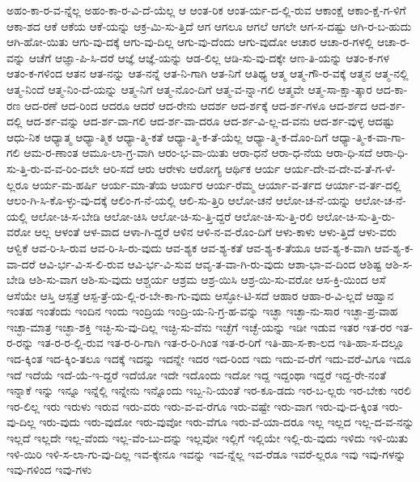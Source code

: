 {ಅಹಂ-ಕಾ-ರ-ವ-ನ್ನೆಲ್ಲ
ಅಹಂ-ಕಾ-ರ-ವಿ-ದೆ-ಯೆಲ್ಲ
ಆ
ಆಂತ-ರಿಕ
ಆಂತ-ರ್ಯ-ದ-ಲ್ಲಿ-ರುವ
ಆಕಾಂಕ್ಷೆ
ಆಕಾಂ-ಕ್ಷೆ-ಗ-ಳಿಗೆ
ಆಕಾ-ಶದ
ಆಕೆ
ಆಕೆಯ
ಆಕೆ-ಯನ್ನು
ಆಕ್ರ-ಮಿ-ಸು-ತ್ತಿದೆ
ಆಗ
ಆಗಲೂ
ಆಗಲೆ
ಆಗಲೇ
ಆಗ-ಸ-ದಷ್ಟು
ಆಗಿ-ರ-ಬ-ಹುದು
ಆಗಿ-ಹೋ-ಯಿತು
ಆಗು-ವು-ದಕ್ಕೆ
ಆಗು-ವು-ದಿಲ್ಲ
ಆಗು-ವು-ದೆಂದು
ಆಗು-ವುದೋ
ಆಚಾರ
ಆಚಾ-ರ-ಗಳಲ್ಲಿ
ಆಚಾ-ರ-ವನ್ನು
ಆಚೆಗೆ
ಆಜ್ಞಾ-ಪಿ-ಸಿ-ದರೆ
ಆಜ್ಞೆ
ಆಜ್ಞೆ-ಯನ್ನು
ಆಡ-ಲಿಲ್ಲ
ಆಡಿ-ಸು-ವು-ದಕ್ಕೇ
ಆಣ-ತಿ-ಯನ್ನು
ಆತಂ-ಕ-ಗಳ
ಆತಂ-ಕ-ಗಳಿಂದ
ಆತನ
ಆತ-ನನ್ನು
ಆತ-ನನ್ನೆ
ಆತ-ನಿ-ಗಾಗಿ
ಆತ-ನಿಗೆ
ಆತಿಥ್ಯ
ಆತ್ಮ
ಆತ್ಮ-ಗೌ-ರ-ವಕ್ಕೆ
ಆತ್ಮನ
ಆತ್ಮ-ನಲ್ಲಿ
ಆತ್ಮ-ನಿಂದೆ
ಆತ್ಮ-ನಿಂ-ದೆ-ಯನ್ನು
ಆತ್ಮ-ನಿಗೆ
ಆತ್ಮ-ನೊಂ-ದಿಗೆ
ಆತ್ಮ-ವ-ನ್ನಾ-ಗಲಿ
ಆತ್ಮವೇ
ಆತ್ಮ-ಸಾ-ಕ್ಷಾ-ತ್ಕಾರ
ಆದ-ಕಾ-ರಣ
ಆದ-ರಣೆ
ಆದ-ರಿಂದ
ಆದರೂ
ಆದರೆ
ಆದ-ರೇನು
ಆದರ್ಶ
ಆದ-ರ್ಶಕ್ಕೆ
ಆದ-ರ್ಶ-ಗಳೂ
ಆದ-ರ್ಶದ
ಆದ-ರ್ಶ-ದಲ್ಲಿ
ಆದ-ರ್ಶ-ವನ್ನು
ಆದ-ರ್ಶ-ವಾ-ಗಲಿ
ಆದ-ರ್ಶ-ವಾ-ದರೂ
ಆದ-ರ್ಶ-ವಿ-ಲ್ಲ-ದ-ವನು
ಆದ-ರ್ಶ-ವುಳ್ಳ
ಆದಷ್ಟು
ಆಧು-ನಿಕ
ಆಧ್ಯಾತ್ಮ
ಆಧ್ಯಾ-ತ್ಮಿಕ
ಆಧ್ಯಾ-ತ್ಮಿ-ಕತೆ
ಆಧ್ಯಾ-ತ್ಮಿ-ಕ-ತೆ-ಯೆಲ್ಲ
ಆಧ್ಯಾ-ತ್ಮಿ-ಕ-ದೊಂ-ದಿಗೆ
ಆಧ್ಯಾ-ತ್ಮಿ-ಕ-ವಾ-ಗಾ-ಗಲಿ
ಆಮ-ರ-ಣಾಂತ
ಆಮೂ-ಲಾ-ಗ್ರ-ವಾಗಿ
ಆರಂ-ಭ-ವಾ-ಯಿತು
ಆರಾ-ಧನೆ
ಆರಾ-ಧ-ನೆಯ
ಆರಾ-ಧಿ-ಸದೆ
ಆರಾ-ಧಿ-ಸು-ತ್ತಿ-ರು-ವ-ವ-ರಿಂ-ದಲೇ
ಆರಿ-ಸದೆ
ಆರು
ಆರೇಳು
ಆರೋಗ್ಯ
ಆರ್ಥಿಕ
ಆರ್ಯ
ಆರ್ಯ-ದೇ-ವ-ದೇ-ವ-ತೆ-ಗ-ಳೆ-ಲ್ಲರೂ
ಆರ್ಯ-ಮ-ಹರ್ಷಿ
ಆರ್ಯ-ಮಾ-ತೆಯ
ಆರ್ಯರ
ಆರ್ಯ-ರೆಮ್ಮ
ಆರ್ಯಾ-ವ-ರ್ತದ
ಆರ್ಯಾ-ವ-ರ್ತ-ದಲ್ಲಿ
ಆಲಂ-ಗಿ-ಸಿ-ಕೊ-ಳ್ಳು-ವು-ದಕ್ಕೆ
ಆಲಿಂ-ಗ-ನೆ-ಯಲ್ಲಿ
ಆಲಿ-ಸು-ತ್ತಿರಿ
ಆಲೋ-ಚನೆ
ಆಲೋ-ಚ-ನೆ-ಯನ್ನು
ಆಲೋ-ಚ-ನೆ-ಯಲ್ಲಿ
ಆಲೋ-ಚಿ-ಸ-ಬೇಡಿ
ಆಲೋ-ಚಿಸಿ
ಆಲೋ-ಚಿ-ಸು-ತ್ತಿ-ದ್ದರೆ
ಆಲೋ-ಚಿ-ಸು-ತ್ತಿ-ರಲಿ
ಆಲೋ-ಚಿ-ಸು-ತ್ತಿ-ರು-ವರೋ
ಆಲ್ಲ
ಆಳಂತೆ
ಆಳ-ವಾದ
ಆಳಾ-ಗಿ-ದ್ದರೆ
ಆಳಿನ
ಆಳಿ-ನ-ವ-ರೊಂ-ದಿಗೆ
ಆಳು-ಕಾಳು
ಆಳು-ತ್ತಿದೆ
ಆಳು-ವರು
ಆಳ್ವಿಕೆ
ಆವ-ರಿ-ಸಿ-ರುವ
ಆವ-ರಿ-ಸಿ-ರು-ವುದು
ಆವ-ಶ್ಯಕ
ಆವ-ಶ್ಯ-ಕತೆ
ಆವ-ಶ್ಯ-ಕ-ತೆಯೂ
ಆವ-ಶ್ಯ-ಕ-ವಾಗಿ
ಆವ-ಶ್ಯ-ಕ-ವಾ-ದರೆ
ಆವಿ-ರ್ಭ-ವಿ-ಸ-ಲಿ-ರುವ
ಆವಿ-ರ್ಭ-ವಿ-ಸುವ
ಆವೃ-ತ-ವಾ-ಗಿ-ರು-ವುದು
ಆಶಾ-ಭಾ-ವ-ದಿಂದ
ಆಶಿಷ್ಟ
ಆಶಿ-ಸ-ಬೇಡಿ
ಆಶಿ-ಸು-ವಾಗ
ಆಶಿ-ಸು-ವುದು
ಆಶ್ಚರ್ಯ
ಆಶ್ರಮ
ಆಶ್ರ-ಯಿಸಿ
ಆಶ್ರ-ಯಿ-ಸು-ವರೋ
ಆಸ-ಕ್ತಿ-ಯಿಂದ
ಆಸೆ
ಆಸೆಯೇ
ಆಸ್ತಿ
ಆಸ್ಪತ್ರೆ
ಆಸ್ಪ-ತ್ರೆ-ಯ-ಲ್ಲಿ-ರ-ಬೇ-ಕಾ-ಗು-ವುದು
ಆಸ್ಫೋ-ಟಿ-ಸದೆ
ಆಹಾರ
ಆಹಾ-ರ-ವಿ-ಲ್ಲದೆ
ಆಹ್ವಾನ
ಇಂತಹ
ಇಂತೆಂದು
ಇಂದಿನ
ಇಂದು
ಇಂದ್ರಿಯ
ಇಂದ್ರಿ-ಯ-ನಿ-ಗ್ರ-ಹ-ವನ್ನು
ಇಚ್ಛಾ
ಇಚ್ಛಾ-ನು-ಸಾರ
ಇಚ್ಛಾ-ಪ್ರ-ವಾಹ
ಇಚ್ಛಾ-ಮಾತ್ರ
ಇಚ್ಛಾ-ಶಕ್ತಿ
ಇಚ್ಛಿ-ಸು-ವು-ದಿಲ್ಲ
ಇಚ್ಛಿ-ಸು-ವೆನು
ಇಚ್ಛೆಗೆ
ಇಚ್ಛೆ-ಯನ್ನು
ಇಡೀ
ಇಡುವ
ಇತರ
ಇತ-ರರ
ಇತ-ರ-ರನ್ನು
ಇತ-ರ-ರ-ಲ್ಲಿ-ರುವ
ಇತ-ರ-ರಿ-ಗಾಗಿ
ಇತ-ರ-ರಿ-ಗಿಂತ
ಇತ-ರ-ರಿಗೆ
ಇತಿ-ಹಾ-ಸ-ಕಾ-ಲದ
ಇತಿ-ಹಾ-ಸ-ದಲ್ಲೂ
ಇದ-ಕ್ಕಿಂತ
ಇದ-ಕ್ಕಿಂ-ತಲೂ
ಇದಕ್ಕೆ
ಇದನ್ನು
ಇದನ್ನೇ
ಇದರ
ಇದ-ರಿಂದ
ಇದು
ಇದು-ವ-ರೆಗೆ
ಇದು-ವರೆ-ವಿಗೂ
ಇದೂ
ಇದೆ
ಇದೆಯೆ
ಇದೆ-ಯೆ-ಇ-ದ್ದರೆ
ಇದೆಯೋ
ಇದೇ
ಇದೊಂದು
ಇದೋ
ಇದ್ದ
ಇದ್ದಂಥಾ
ಇದ್ದರೆ
ಇದ್ದ-ರೇ-ನಂತೆ
ಇನ್ನಾಕೆ
ಇನ್ನು
ಇನ್ನೂ
ಇನ್ನೆಲ್ಲಿ
ಇನ್ನೇನು
ಇನ್ನೊಂದು
ಇಬ್ಬ-ನಿ-ಯಂತೆ
ಇರ-ಕೂ-ಡದು
ಇರ-ಬ-ಲ್ಲರು
ಇರ-ಬೇಕು
ಇರಲಿ
ಇರ-ಲಿಲ್ಲ
ಇರು
ಇರುಳು
ಇರುವ
ಇರು-ವರು
ಇರು-ವ-ವ-ರೆಗೂ
ಇರು-ವಷ್ಟೇ
ಇರು-ವಾಗ
ಇರು-ವು-ದ-ಕ್ಕಿಂತ
ಇರು-ವು-ದಿಲ್ಲ
ಇರು-ವುದು
ಇರು-ವುದೋ
ಇರು-ವುವೋ
ಇರು-ವೆಗೂ
ಇರು-ವೆ-ಯಾ-ದರೂ
ಇಲ್ಲ
ಇಲ್ಲದ
ಇಲ್ಲ-ದ-ವ-ನನ್ನು
ಇಲ್ಲದೆ
ಇಲ್ಲದೇ
ಇಲ್ಲ-ವೆಂದು
ಇಲ್ಲ-ವೆಂ-ಬು-ದನ್ನು
ಇಲ್ಲವೋ
ಇಲ್ಲಿಗೆ
ಇಲ್ಲಿಯೇ
ಇಲ್ಲಿ-ರು-ವುದು
ಇಳಿದು
ಇಳಿ-ಯಿತು
ಇಳಿ-ಯಿರಿ
ಇಳಿ-ಸ-ಲಾ-ಗು-ವು-ದಿಲ್ಲ
ಇವ-ಕ್ಕೇನೂ
ಇವನ್ನು
ಇವ-ನ್ನೆಲ್ಲ
ಇವ-ರೆಡೂ
ಇವರೆ-ಲ್ಲರೂ
ಇವು
ಇವು-ಗಳನ್ನು
ಇವು-ಗಳಿಂದ
ಇವು-ಗಳು
}
